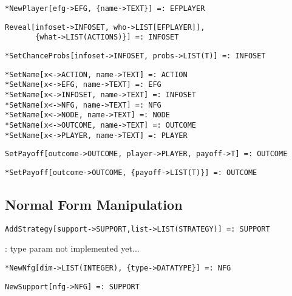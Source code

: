 \protect \large \begin{verbatim}
*NewPlayer[efg->EFG, {name->TEXT}] =: EFPLAYER 
\end{verbatim}\normalsize

\protect \large \begin{verbatim}
Reveal[infoset->INFOSET, who->LIST[EFPLAYER]],
       {what->LIST(ACTIONS)}] =: INFOSET
\end{verbatim}\normalsize

\protect \large \begin{verbatim} 
*SetChanceProbs[infoset->INFOSET, probs->LIST(T)] =: INFOSET
\end{verbatim}\normalsize

\protect \large \begin{verbatim}
*SetName[x<->ACTION, name->TEXT] =: ACTION
*SetName[x<->EFG, name->TEXT] =: EFG
*SetName[x<->INFOSET, name->TEXT] =: INFOSET
*SetName[x<->NFG, name->TEXT] =: NFG
*SetName[x<->NODE, name->TEXT] =: NODE
*SetName[x<->OUTCOME, name->TEXT] =: OUTCOME
*SetName[x<->PLAYER, name->TEXT] =: PLAYER
\end{verbatim}\normalsize

\protect \large \begin{verbatim}
SetPayoff[outcome->OUTCOME, player->PLAYER, payoff->T] =: OUTCOME
\end{verbatim}\normalsize

\protect \large \begin{verbatim}
*SetPayoff[outcome->OUTCOME, {payoff->LIST(T)}] =: OUTCOME
\end{verbatim}\normalsize

\medskip
\subsection{Normal Form Manipulation}

\protect \large \begin{verbatim}
AddStrategy[support->SUPPORT,list->LIST(STRATEGY)] =: SUPPORT
\end{verbatim}\normalsize

: type param not implemented yet...
\protect \large \begin{verbatim}
*NewNfg[dim->LIST(INTEGER), {type->DATATYPE}] =: NFG
\end{verbatim}\normalsize

\protect \large \begin{verbatim}
NewSupport[nfg->NFG] =: SUPPORT
\end{verbatim}\normalsize

